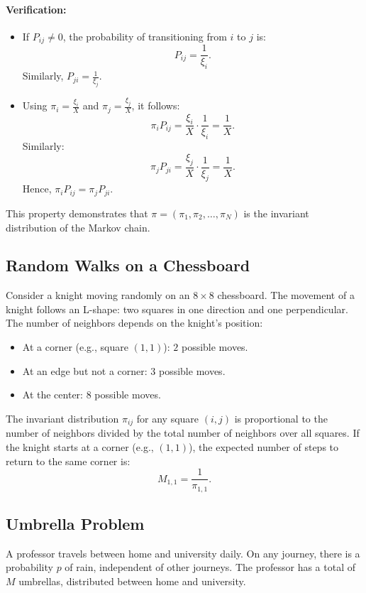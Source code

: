 \paragraph{Verification:}
\begin{itemize}
    \item If \(P_{ij} \neq 0\), the probability of transitioning from \(i\) to \(j\) is:
    \[
    P_{ij} = \frac{1}{\xi_i}.
    \]
    Similarly, \(P_{ji} = \frac{1}{\xi_j}\).
    \item Using \(\pi_i = \frac{\xi_i}{X}\) and \(\pi_j = \frac{\xi_j}{X}\), it follows:
    \[
    \pi_i P_{ij} = \frac{\xi_i}{X} \cdot \frac{1}{\xi_i} = \frac{1}{X}.
    \]
    Similarly:
    \[
    \pi_j P_{ji} = \frac{\xi_j}{X} \cdot \frac{1}{\xi_j} = \frac{1}{X}.
    \]
    Hence, \(\pi_i P_{ij} = \pi_j P_{ji}\).
\end{itemize}
This property demonstrates that \(\pi = (\pi_1, \pi_2, \dots, \pi_N)\) is the invariant distribution of the Markov chain.

\subsection{Random Walks on a Chessboard}
Consider a knight moving randomly on an \(8 \times 8\) chessboard. The movement of a knight follows an L-shape: two squares in one direction and one perpendicular. The number of neighbors depends on the knight's position:
\begin{itemize}
    \item At a corner (e.g., square \((1,1)\)): \(2\) possible moves.
    \item At an edge but not a corner: \(3\) possible moves.
    \item At the center: \(8\) possible moves.
\end{itemize}
The invariant distribution \(\pi_{ij}\) for any square \((i,j)\) is proportional to the number of neighbors divided by the total number of neighbors over all squares. \newline
If the knight starts at a corner (e.g., \((1,1)\)), the expected number of steps to return to the same corner is:
\[
M_{1,1} = \frac{1}{\pi_{1,1}}.
\]

\subsection{Umbrella Problem}
A professor travels between home and university daily. On any journey, there is a probability \(p\) of rain, independent of other journeys. The professor has a total of \(M\) umbrellas, distributed between home and university.

